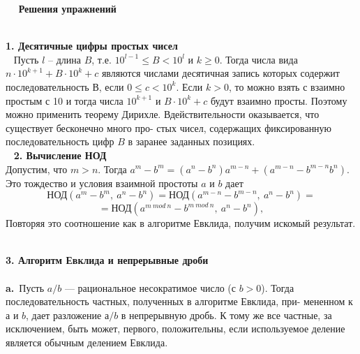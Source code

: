 \documentclass{mai_book}
\begin{document}
\begin{center} %
\ \newline\ \newline
\Large \textbf{Решения упражнений}\\
\ \newline
\end{center}
\noindent\textbf{1. Десятичные цифры простых чисел}\\
\ \newline
\hspace*{15pt}Пусть $l$ -- длина $B$, т.е. $10^{l-1}\leqslant B <10^l$\: и \:$k\geqslant 0$. Тогда числа вида\linebreak
$n\cdot10^{k+1} + B\cdot10^k + c$ являются числами десятичная запись которых\linebreak
содержит последовательность $В$, если $ 0 \leqslant c < 10^k.$ Если $k > 0$, то\linebreak
можно взять $с$ взаимно простым с 10 и тогда числа $10^{k+1}$ и $B\cdot10^k + c$\linebreak
будут взаимно просты. Поэтому можно применить теорему Дирихле. В\linebreak действительности оказывается, что существует бесконечно много про­-\linebreak
стых чисел, содержащих фиксированную последовательность цифр $B$ в\linebreak
заранее заданных позициях.\\
\ \newline
\noindent\textbf{2. Вычисление НОД}\\

\hspace*{0pt} Допустим, что $m>n$. Тогда $a^m - b^m = (a^n-b^n)a^{m-n}+(a^{m-n}-b^{m-n}b^n)$.\linebreak 
Это тождество и условия взаимной простоты $a$ и $b$ дает\newline
$$\text{НОД}(a^m-b^m,\ a^n-b^n)=\text{НОД}(a^{m-n}-b^{m-n},\ a^n-b^n)=$$
	$$=\text{НОД}(a^{m\ mod\ n}-b^{m\ mod\ n},\ a^n-b^n),$$
Повторяя это соотношение как в алгоритме Евклида, получим искомый результат.
\ \newline

\noindent\textbf{3. Алгоритм Евклида и непрерывные дроби}\\
\\
\hspace*{10pt} \textbf{a.}\ Пусть $a/b$ — рациональное несократимое число (с $b > 0$). Тогда\linebreak 
последовательность частных, полученных в алгоритме Евклида, при­-\linebreak
мененном к $а$ и $b$, дает разложение $а/b$ в непрерывную дробь. К тому\linebreak
же все частные, за исключением, быть может, первого, положительны,\linebreak
если используемое деление является обычным делением Евклида.\linebreak
\end{document}
